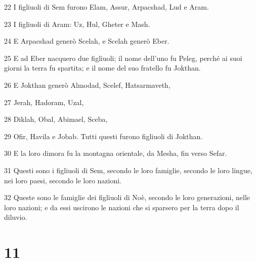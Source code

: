 \par 22 I figliuoli di Sem furono Elam, Assur, Arpacshad, Lud e Aram.
\par 23 I figliuoli di Aram: Uz, Hul, Gheter e Mash.
\par 24 E Arpacshad generò Scelah, e Scelah generò Eber.
\par 25 E ad Eber nacquero due figliuoli; il nome dell'uno fu Peleg, perché ai suoi giorni la terra fu spartita; e il nome del suo fratello fu Jokthan.
\par 26 E Jokthan generò Almodad, Scelef, Hatsarmaveth,
\par 27 Jerah, Hadoram, Uzal,
\par 28 Diklah, Obal, Abimael, Sceba,
\par 29 Ofir, Havila e Jobab. Tutti questi furono figliuoli di Jokthan.
\par 30 E la loro dimora fu la montagna orientale, da Mesha, fin verso Sefar.
\par 31 Questi sono i figliuoli di Sem, secondo le loro famiglie, secondo le loro lingue, nei loro paesi, secondo le loro nazioni.
\par 32 Queste sono le famiglie dei figliuoli di Noè, secondo le loro generazioni, nelle loro nazioni; e da essi uscirono le nazioni che si sparsero per la terra dopo il diluvio.

\chapter{11}

